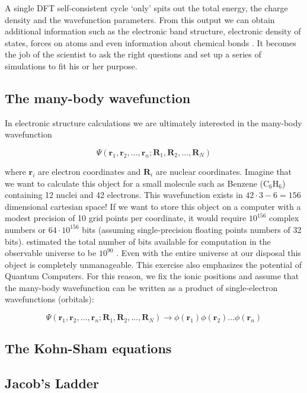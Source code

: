 A single DFT self-consistent cycle `only' spits out the total energy, the charge density and the wavefunction parameters. From this output we can obtain additional information such as the electronic band structure, electronic density of states, forces on atoms and even information about chemical bonds \cite{Silvi1994}. It becomes the job of the scientist to ask the right questions and set up a series of simulations to fit his or her purpose.

\subsection{The many-body wavefunction}
In electronic structure calculations we are ultimately interested in the many-body wavefunction

\[ \Psi(\bm{r}_1,\bm{r}_2,\dots, \bm{r}_n; \bm{R}_1, \bm{R}_2, \dots , \bm{R}_N) \]

\noindent where $\bm{r}_i$ are electron coordinates and $\bm{R}_i$ are nuclear coordinates. Imagine that we want to calculate this object for a small molecule such as Benzene (C$_6$H$_6$) containing 12 nuclei and 42 electrons. This wavefunction exists in $42\cdot3-6 = 156$ dimensional cartesian space! If we want to store this object on a computer with a modest precision of 10 grid points per coordinate, it would require $10^{156}$ complex numbers or $64 \cdot 10^{156}$ bits (assuming single-precision floating points numbers of 32 bits). \citeauthor{Lloyd2002} estimated the total number of bits available for computation in the observable universe to be $10^{90}$ \cite{Lloyd2002}. Even with the entire universe at our disposal this object is completely unmanageable. This exercise also emphasizes the potential of Quantum Computers. For this reason, we fix the ionic positions and assume that the many-body wavefunction can be written as a product of single-electron wavefunctions (orbitals):

\[ \Psi(\bm{r}_1,\bm{r}_2,\dots, \bm{r}_n; \bm{R}_1, \bm{R}_2, \dots , \bm{R}_N) \longrightarrow \phi(\bm{r}_1)\phi(\bm{r}_2)\dots\phi(\bm{r}_n) \]

\subsection{The Kohn-Sham equations}

\subsection{Jacob's Ladder}

